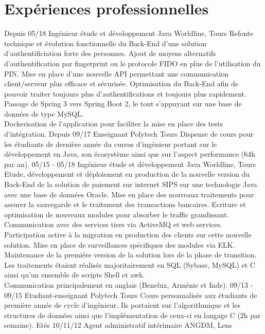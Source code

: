 \documentclass[]{friggeri-cv}
\begin{document}
\section{Expériences professionnelles}
\begin{entrylist}
      \vspace{7pt}    
  \entry
    {Depuis 05/18}
    {Ingénieur étude et développement Java}
    {Worldline, Tours}
    {Refonte technique et évolution fonctionnelle du Back-End d'une solution d'authentificiation forte des personnes. Ajout de moyens alternatifs d'authentification par fingerprint ou le protocole FIDO en plus de l'utilisation du PIN. Mise en place d'une nouvelle API permettant une communication client/serveur plus efficace et sécurisée. Optimisation  du Back-End afin de pouvoir traiter toujours plus d'authentifications et toujours plus rapidement. Passage de Spring 3 vers Spring Boot 2, le tout s'appuyant sur une base de données de type MySQL. \\Dockerisation de l'application pour faciliter la mise en place des tests d'intégration.}
      \vspace{7pt}    
  \entry
    {Depuis 09/17}
    {Enseignant}
    {Polytech Tours}
    {Dispense de cours pour les étudiants de dernière année du cursus d'ingénieur portant sur le développement en Java, son écosystème ainsi que sur l'aspect performance (64h par an).}
      \vspace{7pt}    
    \entry
    {05/15 - 05/18}
    {Ingénieur étude et développement Java}
    {Worldline, Tours}
    {Etude, développement et déploiement en production de la nouvelle version du Back-End de la solution de paiement sur internet SIPS sur une technologie Java avec une base de données Oracle. Mise  en place des nouveaux traitements pour assurer la sauvegarde et le traitement des transactions bancaires. Ecriture et optimisation de nouveaux modules pour absorber le traffic grandissant. Communication avec des services tiers via ActiveMQ et web services.\\ Participation active à la migration en production des clients sur cette nouvelle solution. Mise en place de surveillances spécifiques des modules via ELK.\\ Maintenance de la première version de la solution lors de la phase de transition. Les traitements étaient réalisés majoritairement en SQL (Sybase, MySQL) et C ainsi qu'un ensemble de scripts Shell et awk.\\Communication principalement en anglais (Benelux, Arménie et Inde).}
      \vspace{7pt}      
    \entry
    {09/13 - 09/15}
    {Etudiant-enseignant}
    {Polytech Tours}
    {Cours personnalisés aux étudiants de première année de cycle d'ingénieur. Ils portaient sur l'algorithmique et les structures de données ainsi que l'implémentation de ceux-ci en langage C (2h par semaine).}
      \vspace{7pt}      
    \entry
    {Etés 10/11/12}
    {Agent administratif intérimaire}
    {ANGDM, Lens}
    {}
\end{entrylist}
\end{document}
